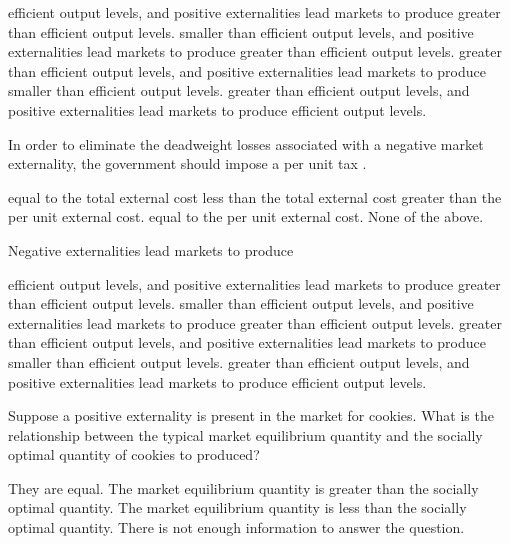 \documentclass[addpoints,11pt]{exam}
\theoremstyle{definition}
\newcommand{\blank}[0]{\underline{\hspace{3cm}}}
\begin{document}
\begin{questions}
\begin{choices}
	\choice efficient output levels, and positive externalities lead markets to produce greater than efficient output levels.
	\choice smaller than efficient output levels, and positive externalities lead markets to produce greater than efficient output levels.
	\CorrectChoice greater than efficient output levels, and positive externalities lead markets to produce smaller than efficient output levels.
	\choice greater than efficient output levels, and positive externalities lead markets to produce efficient output levels.
\end{choices}

\question In order to eliminate the deadweight losses associated with a negative market externality, the government should impose a per unit tax \blank.
\begin{choices}
	\choice equal to the total external cost
	\choice less than the total external cost
	\choice greater than the per unit external cost.
	\CorrectChoice equal to the per unit external cost.
	\choice None of the above.
\end{choices}



\question Negative externalities lead markets to produce

\begin{choices}
	\choice efficient output levels, and positive externalities lead markets to produce greater than efficient output levels.
	\choice smaller than efficient output levels, and positive externalities lead markets to produce greater than efficient output levels.
	\CorrectChoice greater than efficient output levels, and positive externalities lead markets to produce smaller than efficient output levels.
	\choice greater than efficient output levels, and positive externalities lead markets to produce efficient output levels.
\end{choices}

\question Suppose a positive externality is present in the market for cookies. What is the relationship between the typical market equilibrium quantity and the socially optimal quantity of cookies to produced?

\begin{choices}
	\choice They are equal.
	\choice The market equilibrium quantity is greater than the socially optimal quantity.
	\CorrectChoice The market equilibrium quantity is less than the socially optimal quantity.
	\choice There is not enough information to answer the question.
\end{choices}


\end{questions}
\end{document}
